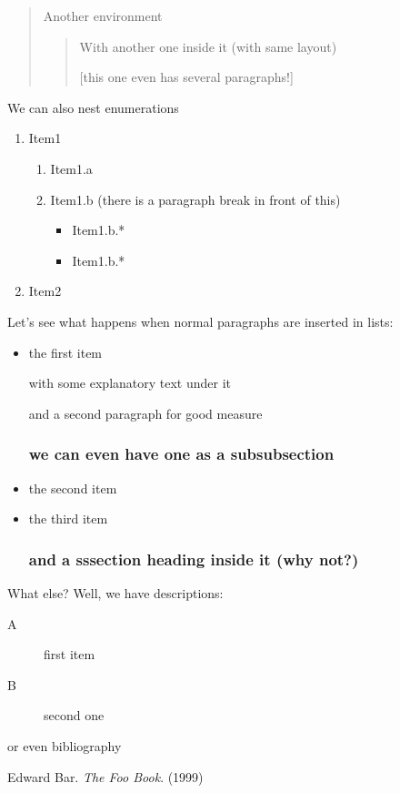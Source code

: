 \documentclass{article}
\begin{document}
\begin{quotation}
Another environment

\begin{quotation}
With another one inside it (with same layout)

[this one even has several paragraphs!]
\end{quotation}

\end{quotation}

We can also nest enumerations

\begin{enumerate}
\item Item1
\begin{enumerate}
\item Item1.a

\item Item1.b (there is  a paragraph break in front of this)
\begin{itemize}
\item Item1.b.*
\item Item1.b.*
\end{itemize}
\end{enumerate}
\item Item2
\end{enumerate}

Let's see what happens when normal paragraphs are inserted in lists:

\begin{itemize}
\item the first item

with some explanatory text under it

and a second paragraph for good measure

\subsubsection*{we can even have one as a subsubsection}

\item the second item

\item the third item

\subsubsection*{and a sssection heading inside it (why not?)}
\end{itemize}

What else? Well, we have descriptions:
\begin{description}
\item[A] first item
\item[B] second one
\end{description}

or even bibliography
\begin{thebibliography}{9}
 Edward Bar. \emph{The Foo Book}. (1999)
\end{thebibliography}
\end{document}
